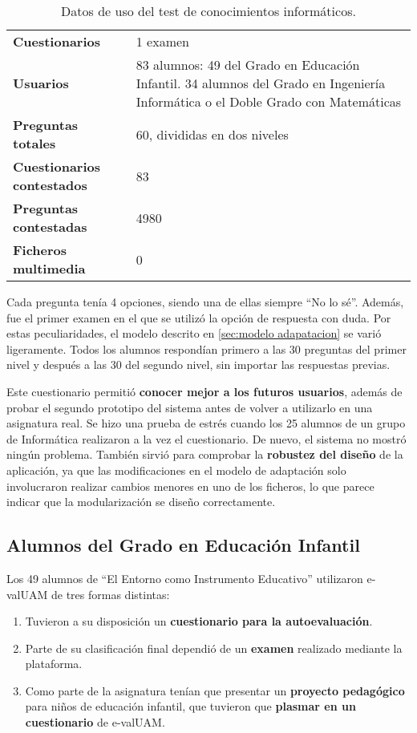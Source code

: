 \begin{table}[hc]
	\centering
	\begin{tabular}{l|p{10cm}}
		{\bf Cuestionarios}             & 1 examen \\ 
		{\bf Usuarios}                  & 83 alumnos: 49 del Grado en Educación Infantil. 34 alumnos del Grado en Ingeniería Informática o el Doble Grado con Matemáticas \\
		{\bf Preguntas totales}         & 60, divididas en dos niveles    \\ 
		{\bf Cuestionarios contestados} & 83                              \\ 
		{\bf Preguntas contestadas}     & 4980                             \\ 
		{\bf Ficheros multimedia}		& 0							   \\
	\end{tabular}
	\caption{Datos de uso del test de conocimientos inform\'aticos.}
\end{table}

Cada pregunta tenía 4 opciones, siendo una de ellas siempre ``No lo sé''. Además, fue el primer examen en el que se utilizó la opción de respuesta con duda. Por estas peculiaridades, el modelo descrito en \ref{sec:modelo adapatacion} se varió ligeramente. Todos los alumnos respondían primero a las 30 preguntas del primer nivel y después a las 30 del segundo nivel, sin importar las respuestas previas.

Este cuestionario permitió \textbf{conocer mejor a los futuros usuarios}, además de probar el segundo prototipo del sistema antes de volver a utilizarlo en una asignatura real. Se hizo una prueba de estrés cuando los 25 alumnos de un grupo de Informática realizaron a la vez el cuestionario. De nuevo, el sistema no mostró ningún problema. También sirvió para comprobar la \textbf{robustez del diseño} de la aplicación, ya que las modificaciones en el modelo de adaptación solo involucraron realizar cambios menores en uno de los ficheros, lo que parece indicar que la modularización se diseño correctamente.

\subsection{Alumnos del Grado en Educación Infantil}

Los 49 alumnos de ``El Entorno como Instrumento Educativo'' utilizaron \acrshort{e-valUAM} de tres formas distintas:

\begin{enumerate}
 	\item Tuvieron a su disposición un \textbf{cuestionario para la autoevaluación}. 
 	\item Parte de su clasificación final dependió de un \textbf{examen} realizado mediante la plataforma. 
 	\item Como parte de la asignatura tenían que presentar un \textbf{proyecto pedagógico} para niños de educación infantil, que tuvieron que \textbf{plasmar en un cuestionario} de \acrshort{e-valUAM}. 
\end{enumerate}


